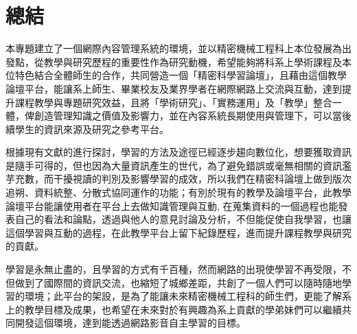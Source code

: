 \chapter{總結}
\renewcommand{\baselinestretch}{10} %
\par
\renewcommand{\baselinestretch}{1} %
\twelve 本專題建立了一個網際內容管理系統的環境，並以精密機械工程科上本位發展為出發點，從教學與研究歷程的重要性作為研究動機，希望能夠將科系上學術課程及本位特色結合全體師生的合作，共同營造一個「精密科學習論壇」，且藉由這個教學論壇平台，能讓系上師生、畢業校友及業界學者在網際網路上交流與互動，達到提升課程教學與專題研究效益，且將「學術研究」、「實務運用」及「教學」整合一體，俾創造管理知識之價值及影響力，並在內容系統長期使用與管理下，可以當後續學生的資訊來源及研究之參考平台。
\\
\par
\renewcommand{\baselinestretch}{1} %
\twelve 根據現有文獻的進行探討，學習的方法及途徑已經逐步趨向數位化，想要獲取資訊是隨手可得的，但也因為大量資訊產生的世代，為了避免錯誤或毫無相關的資訊濫芋充數，而干擾視讀的判別及影響學習的成效，所以我們在精密科論壇上做到版次追朔、資料統整、分散式協同運作的功能；有別於現有的教學及論壇平台，此教學論壇平台能讓使用者在平台上去做知識管理與互動, 在蒐集資料的一個過程也能發表自己的看法和論點，透過與他人的意見討論及分析，不但能促使自我學習，也讓這個學習與互動的過程，在此教學平台上留下紀錄歷程，進而提升課程教學與研究的貢獻。 
\\
\par
\renewcommand{\baselinestretch}{1} %
\twelve 學習是永無止盡的，且學習的方式有千百種，然而網路的出現使學習不再受限，不但做到了國際間的資訊交流，也縮短了城鄉差距，共創了一個人們可以隨時隨地學習的環境；此平台的架設，是為了能讓未來精密機械工程科的師生們，更能了解系上的教學目標及成果，也希望在未來對於有興趣為系上貢獻的學弟妹們可以繼續共同開發這個環境，達到能透過網路影音自主學習的目標。
\par
